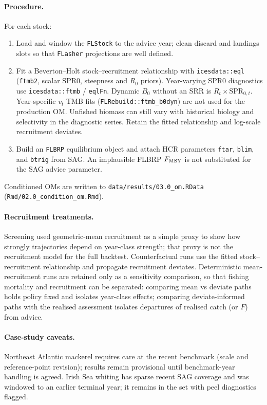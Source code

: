 \documentclass[11pt,a4paper]{extarticle}
\begin{document}
\paragraph{Procedure.}
For each stock:
\begin{enumerate}
  \item Load and window the \texttt{FLStock} to the advice year; clean discard
        and landings slots so that \texttt{FLasher} projections are well
        defined.
  \item Fit a Beverton--Holt stock--recruitment relationship with
        \texttt{icesdata::eql} (\texttt{ftmb2}, scalar SPR0, steepness and
        \(R_0\) priors). Year-varying SPR0 diagnostics use
        \texttt{icesdata::ftmb} / \texttt{eqlFn}. Dynamic \(B_0\) without an
        SRR is \(R_t \times \mathrm{SPR}_{0,t}\). Year-specific \(v_t\) TMB
        fits (\texttt{FLRebuild::ftmb\_b0dyn}) are not used for the production
        OM. Unfished biomass can still vary with historical biology and
        selectivity in the diagnostic series. Retain the fitted relationship
        and log-scale recruitment deviates.
  \item Build an \texttt{FLBRP} equilibrium object and attach HCR parameters
        \texttt{ftar}, \texttt{blim}, and \texttt{btrig} from SAG. An
        implausible FLBRP \(F_{\mathrm{MSY}}\) is not substituted for the SAG advice
        parameter.
\end{enumerate}
Conditioned OMs are written to \texttt{data/results/03.0\_om.RData}
(\texttt{Rmd/02.0\_condition\_om.Rmd}).

\paragraph{Recruitment treatments.}
Screening used geometric-mean recruitment as a simple proxy to show how
strongly trajectories depend on year-class strength; that proxy is not the
recruitment model for the full backtest. Counterfactual runs use the fitted
stock--recruitment relationship and propagate recruitment deviates. Deterministic
mean-recruitment runs are retained only as a sensitivity comparison, so that
fishing mortality and recruitment can be separated: comparing mean vs deviate
paths holds policy fixed and isolates year-class effects; comparing deviate-informed
paths with the realised assessment isolates departures of realised catch (or
\(F\)) from advice.

\paragraph{Case-study caveats.}
Northeast Atlantic mackerel requires care at the recent benchmark (scale and
reference-point revision); results remain provisional until benchmark-year
handling is agreed. Irish Sea whiting has sparse recent SAG coverage and was
windowed to an earlier terminal year; it remains in the set with peel
diagnostics flagged.
\end{document}
